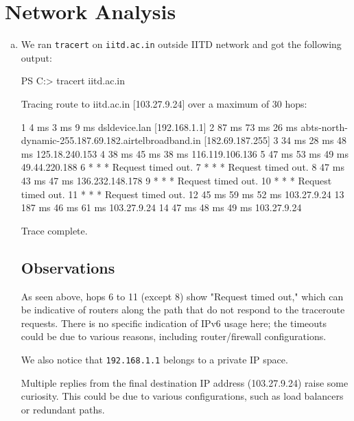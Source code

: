 \section{Network Analysis}
\begin{enumerate}[a.]
    \item We ran {\tt tracert} on {\tt iitd.ac.in} outside IITD network and got the following output:
    \begin{code}
PS C:\Users\Anish> tracert iitd.ac.in

Tracing route to iitd.ac.in [103.27.9.24]
over a maximum of 30 hops:

 1    4 ms    3 ms    9 ms dsldevice.lan [192.168.1.1]
 2   87 ms   73 ms   26 ms abts-north-dynamic-255.187.69.182.airtelbroadband.in [182.69.187.255]
 3   34 ms   28 ms   48 ms 125.18.240.153
 4   38 ms   45 ms   38 ms 116.119.106.136
 5   47 ms   53 ms   49 ms 49.44.220.188
 6    *       *       *    Request timed out.
 7    *       *       *    Request timed out.
 8   47 ms   43 ms   47 ms 136.232.148.178
 9    *       *       *    Request timed out.
10    *       *       *    Request timed out.
11    *       *       *    Request timed out.
12   45 ms   59 ms   52 ms 103.27.9.24
13  187 ms   46 ms   61 ms 103.27.9.24
14   47 ms   48 ms   49 ms 103.27.9.24

Trace complete.
    \end{code}
    \subsection*{Observations}
    As seen above, hops 6 to 11 (except 8) show "Request timed out," which can be indicative of routers along the path that do not respond to the traceroute requests. There is no specific indication of IPv6 usage here; the timeouts could be due to various reasons, including router/firewall configurations. 

    We also notice that {\tt 192.168.1.1} belongs to a private IP space.

    Multiple replies from the final destination IP address (103.27.9.24) raise some curiosity. This could be due to various configurations, such as load balancers or redundant paths.


\end{enumerate}
